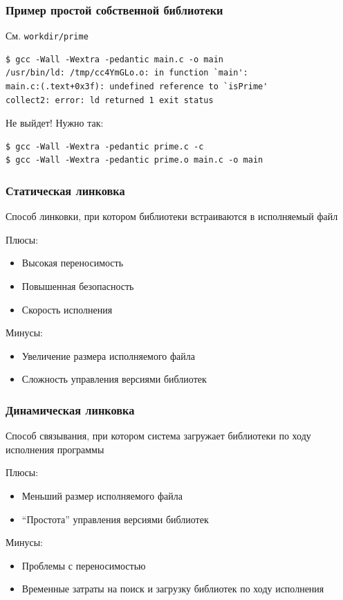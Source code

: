 \documentclass[aspectratio=169]{beamer}
\begin{document}
\begin{frame}[fragile]
    \frametitle{Пример простой собственной библиотеки}

    См. \texttt{workdir/prime}

    \begin{verbatim}
$ gcc -Wall -Wextra -pedantic main.c -o main
/usr/bin/ld: /tmp/cc4YmGLo.o: in function `main':
main.c:(.text+0x3f): undefined reference to `isPrime'
collect2: error: ld returned 1 exit status
    \end{verbatim}

    Не выйдет!
    Нужно так:
    \begin{verbatim}
$ gcc -Wall -Wextra -pedantic prime.c -c
$ gcc -Wall -Wextra -pedantic prime.o main.c -o main
    \end{verbatim}

\end{frame}

\begin{frame}
    \frametitle{Статическая линковка}

    Способ линковки, при котором библиотеки встраиваются в исполняемый файл

    Плюсы:
    \begin{itemize}
        \item Высокая переносимость
        \item Повышенная безопасность
        \item Скорость исполнения
    \end{itemize}
    Минусы:
    \begin{itemize}
        \item Увеличение размера исполняемого файла
        \item Сложность управления версиями библиотек
    \end{itemize}
\end{frame}

\begin{frame}
    \frametitle{Динамическая линковка}

    Способ связывания, при котором система загружает библиотеки по ходу исполнения программы

    Плюсы:
    \begin{itemize}
        \item Меньший размер исполняемого файла
        \item \enquote{Простота} управления версиями библиотек
    \end{itemize}
    Минусы:
    \begin{itemize}
        \item Проблемы с переносимостью
        \item Временные затраты на поиск и загрузку библиотек по ходу исполнения
    \end{itemize}
\end{frame}
\end{document}
